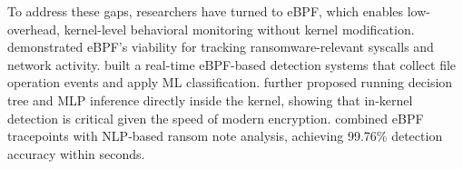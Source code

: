 \documentclass[twocolumn, 10pt]{scrartcl}
\begin{document}
To address these gaps, researchers have turned to eBPF, which enables low-overhead, kernel-level behavioral monitoring without kernel modification. 
\cite{zhuravchak2023} demonstrated eBPF's viability for tracking ransomware-relevant syscalls and network activity. 
\cite{higuchi2023,zhuravchak2023real} built a real-time eBPF-based detection systems that collect file operation events and apply ML classification. 
\cite{philippart2024} further proposed running decision tree and MLP inference directly inside the kernel, showing that in-kernel detection is critical given the speed of modern encryption. 
\cite{sekar2024} combined eBPF tracepoints with NLP-based ransom note analysis, achieving 99.76\%  detection accuracy within seconds. 


\end{document}
